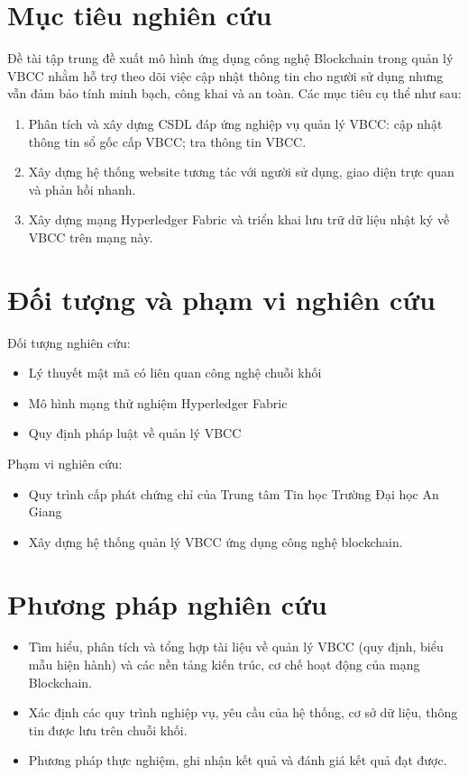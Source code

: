 \section{Mục tiêu nghiên cứu}

Đề tài tập trung đề xuất mô hình ứng dụng công nghệ Blockchain trong quản lý VBCC nhằm hỗ trợ theo dõi việc cập nhật thông tin cho người sử dụng nhưng vẫn đảm bảo tính minh bạch, công khai và an toàn. Các mục tiêu cụ thể như sau:

\begin{enumerate}
\item Phân tích và xây dựng CSDL đáp ứng nghiệp vụ quản lý VBCC: cập nhật thông tin sổ gốc cấp VBCC; tra thông tin VBCC.
\item Xây dựng hệ thống website tương tác với người sử dụng, giao diện trực quan và phản hồi nhanh.
\item Xây dựng mạng Hyperledger Fabric và triển khai lưu trữ dữ liệu nhật ký về VBCC trên mạng này.
\end{enumerate}

\section{Đối tượng và phạm vi nghiên cứu}

Đối tượng nghiên cứu:

\begin{itemize}
\item Lý thuyết mật mã có liên quan công nghệ chuỗi khối
\item Mô hình mạng thử nghiệm Hyperledger Fabric
\item Quy định pháp luật về quản lý VBCC
\end{itemize}

Phạm vi nghiên cứu:

\begin{itemize}
\item Quy trình cấp phát chứng chỉ của Trung tâm Tin học Trường Đại học An Giang
\item Xây dựng hệ thống quản lý VBCC ứng dụng công nghệ blockchain.
\end{itemize}

\section{Phương pháp nghiên cứu}

\begin{itemize}
\item Tìm hiểu, phân tích và tổng hợp tài liệu về quản lý VBCC (quy định, biểu mẫu hiện hành) và các nền tảng kiến trúc, cơ chế hoạt động của mạng Blockchain.
\item Xác định các quy trình nghiệp vụ, yêu cầu của hệ thống, cơ sở dữ liệu, thông tin được lưu trên chuỗi khối.
\item Phương pháp thực nghiệm, ghi nhận kết quả và đánh giá kết quả đạt được.
\end{itemize}
